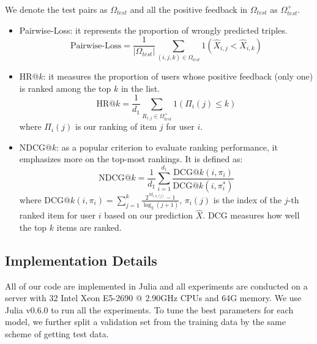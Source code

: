 \documentclass{article}
\numberwithin{equation}{section}
\newtheorem{sampling strategy}{Sampling Strategy}
\begin{document}
We denote the test pairs as $\Omega_{test}$ and all the positive feedback in $\Omega_{test}$ as ${\Omega}_{test}^+$.

\begin{itemize}
    \item Pairwise-Loss: it represents the proportion of wrongly predicted triples.
    $$ \text{Pairwise-Loss} = \frac{1}{|\Omega_{test}|} \sum_{ (i,j,k) \in \Omega_{test} } 1(\hat{X}_{i,j} < \hat{X}_{i,k}) $$
    \item HR@$k$: it measures the proportion of users whose positive feedback (only one) is ranked among the  top $k$ in  the list. 
    $$ \text{HR@}k = \frac{1}{d_1}  \underset{R_{i,j} \in \Omega_{test}^+}{\sum} 1( \Pi_i(j) \leq k ) $$
    where $\Pi_i(j)$ is our ranking of item $j$ for user $i$.
    \item NDCG@$k$: as a popular criterion to evaluate ranking performance, it emphasizes more on the top-most rankings. It is defined as:
    $$ \text{NDCG@}k = \frac{1}{d_1} \sum_{i=1}^{d_1} \frac{\text{DCG@}k(i, \pi_{i})}{\text{DCG@}k(i, \pi^*_i)} $$
    where $\displaystyle \text{DCG@}k(i,\pi_i) = \sum_{j=1}^k \frac{2^{M_{i,\pi_i(j)}} - 1}{\log_2(j+1)}$, { $\pi_i(j)$ is the index of the $j$-th ranked item for user $i$ based on our prediction $\hat{X}$. DCG measures how well the top $k$ items are ranked.} 
\end{itemize}

\subsection{Implementation Details}

All of our code are implemented in Julia and all experiments are conducted on a server with 32 Intel Xeon  E5-2690 @ 2.90GHz CPUs and 64G memory. We use Julia v0.6.0 to run all the experiments. To tune the best parameters for each model, we further split a validation set from the training data by the same scheme of getting test data. 

\end{document}

